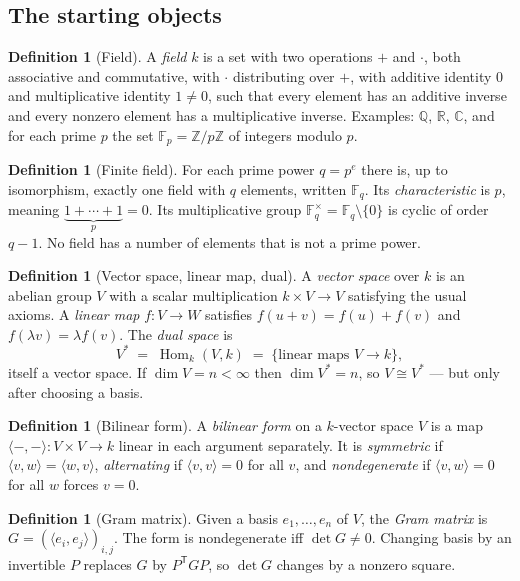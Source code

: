 \documentclass[11pt,a4paper]{article}
\theoremstyle{definition}
\newtheorem{definition}[theorem]{Definition}
\theoremstyle{remark}
\newcommand{\FF}{\mathbb{F}}
\newcommand{\CC}{\mathbb{C}}
\newcommand{\RR}{\mathbb{R}}
\newcommand{\QQ}{\mathbb{Q}}
\newcommand{\ZZ}{\mathbb{Z}}
\newcommand{\ip}[2]{\langle #1, #2 \rangle}
\newcommand{\dual}[1]{#1^{*}}
\DeclareMathOperator{\Hom}{Hom}
\begin{document}
\subsection{The starting objects}

\begin{definition}[Field]
A \emph{field} $k$ is a set with two operations $+$ and $\cdot$, both associative and
commutative, with $\cdot$ distributing over $+$, with additive identity $0$ and
multiplicative identity $1 \neq 0$, such that every element has an additive inverse and
every nonzero element has a multiplicative inverse. Examples: $\QQ$, $\RR$, $\CC$, and for
each prime $p$ the set $\FF_p = \ZZ/p\ZZ$ of integers modulo $p$.
\end{definition}

\begin{definition}[Finite field]
For each prime power $q = p^{e}$ there is, up to isomorphism, exactly one field with $q$
elements, written $\FF_q$. Its \emph{characteristic} is $p$, meaning $\underbrace{1 + \cdots
+ 1}_{p} = 0$. Its multiplicative group $\FF_q^{\times} = \FF_q \setminus \{0\}$ is cyclic
of order $q - 1$. No field has a number of elements that is not a prime power.
\end{definition}

\begin{definition}[Vector space, linear map, dual]
A \emph{vector space} over $k$ is an abelian group $V$ with a scalar multiplication
$k \times V \to V$ satisfying the usual axioms. A \emph{linear map} $f : V \to W$ satisfies
$f(u+v) = f(u)+f(v)$ and $f(\lambda v) = \lambda f(v)$. The \emph{dual space} is
\[
  \dual{V} \;=\; \Hom_k(V, k) \;=\; \{\text{linear maps } V \to k\},
\]
itself a vector space. If $\dim V = n < \infty$ then $\dim \dual{V} = n$, so
$V \cong \dual{V}$ --- but only after choosing a basis.
\end{definition}

\begin{definition}[Bilinear form]
A \emph{bilinear form} on a $k$-vector space $V$ is a map $\ip{-}{-} : V \times V \to k$
linear in each argument separately. It is \emph{symmetric} if $\ip{v}{w} = \ip{w}{v}$,
\emph{alternating} if $\ip{v}{v} = 0$ for all $v$, and \emph{nondegenerate} if
$\ip{v}{w} = 0$ for all $w$ forces $v = 0$.
\end{definition}

\begin{definition}[Gram matrix]
Given a basis $e_1, \dots, e_n$ of $V$, the \emph{Gram matrix} is
$G = (\ip{e_i}{e_j})_{i,j}$. The form is nondegenerate iff $\det G \neq 0$. Changing basis
by an invertible $P$ replaces $G$ by $P^{\mathsf{T}} G P$, so $\det G$ changes by a nonzero
square.
\end{definition}
\end{document}
